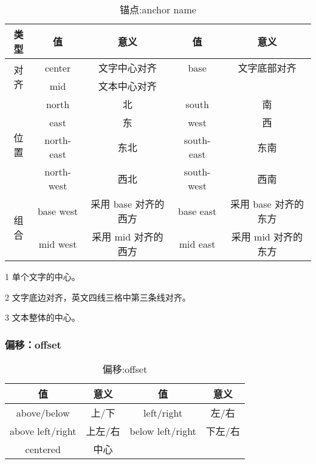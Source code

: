 \begin{table}[H]
    \centering
    \caption{锚点:anchor name}
    \label{table:锚点:anchor name}
    \setlength{\tabcolsep}{3.8mm}
    \begin{threeparttable}
        \begin{tabular}{c|cc|cc}
            \toprule
            \textbf{类型} & \textbf{值} & \textbf{意义} & \textbf{值} & \textbf{意义}\\
            \midrule
            \multirow{2}{*}{对齐}   & center & 文字中心对齐\tnote{1} & base & 文字底部对齐\tnote{2} \\
                                    & mid & 文本中心对齐\tnote{3} &  &  \\
            \midrule
            \multirow{4}{*}{位置}   & north & 北 & south & 南 \\
                                    & east & 东 & west & 西 \\
                                    & north-east & 东北 & south-east & 东南 \\
                                    & north-west & 西北 & south-west & 西南 \\
            \midrule
            \multirow{2}{*}{组合}   & base west & 采用 base 对齐的西方 & base east & 采用 base 对齐的东方\\
                                    & mid west & 采用 mid 对齐的西方 & mid east & 采用 mid 对齐的东方\\
            \bottomrule
        \end{tabular}
        \begin{tablenotes}
            \footnotesize
            \item[1] 单个文字的中心。
            \item[2] 文字底边对齐，英文四线三格中第三条线对齐。
            \item[3] 文本整体的中心。
        \end{tablenotes}
    \end{threeparttable}
\end{table}

\subsubsection{偏移：offset}

\begin{table}[H]
    \centering
    \caption{偏移:offset}
    \label{table:偏移:offset}
    \setlength{\tabcolsep}{9mm}
    \begin{threeparttable}
        \begin{tabular}{c|cc|c}
            \toprule
            \textbf{值} & \textbf{意义} & \textbf{值} & \textbf{意义}\\
            \midrule
            above/below & 上/下 & left/right & 左/右 \\
            above left/right & 上左/右 & below left/right & 下左/右  \\
            centered & 中心 & & \\
            \bottomrule
        \end{tabular}
    \end{threeparttable}
\end{table}

